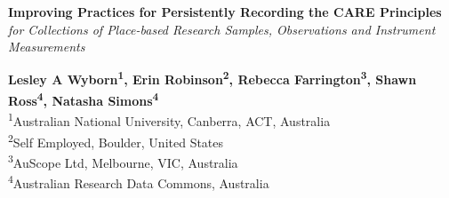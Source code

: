 \documentclass[a0,portrait]{a0poster}
\begin{document}
\noindent\begin{minipage}[t]{\linewidth}
\Huge \color{ARDCBlue} \textbf{Improving Practices for Persistently Recording the CARE Principles} \color{Black}\\[0.3cm]
\LARGE\textit{for Collections of Place-based Research Samples, Observations and Instrument Measurements}\\[1cm]
\end{minipage}



\noindent\begin{minipage}[t]{0.75\linewidth}
\Large \textbf{Lesley A Wyborn\textsuperscript{1}, Erin Robinson\textsuperscript{2}, Rebecca Farrington\textsuperscript{3}, Shawn Ross\textsuperscript{4}, Natasha Simons\textsuperscript{4}}\\[0.5cm]
\large \textsuperscript{1}Australian National University, Canberra, ACT, Australia\\
\textsuperscript{2}Self Employed, Boulder, United States\\
\textsuperscript{3}AuScope Ltd, Melbourne, VIC, Australia\\
\textsuperscript{4}Australian Research Data Commons, Australia
\end{minipage}%
\begin{minipage}[t]{0.25\linewidth}
\raggedleft
{}
\end{minipage}



\vspace{1cm}
\end{document}
